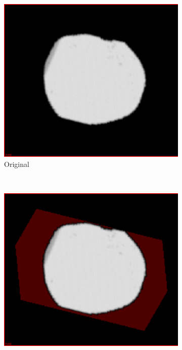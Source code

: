 \begin{figure}[h]
  \centering
  \begin{subfigure}[b]{0.45\textwidth}
    \includegraphics[width=\textwidth]{images/erosion/erosion_0.png}
    \caption{Original}
    \label{fig:erosion0}
  \end{subfigure}%
  ~ %
  \begin{subfigure}[b]{0.45\textwidth}
    \includegraphics[width=\textwidth]{images/erosion/erosion_1.png}

\end{subfigure}
\end{figure}
